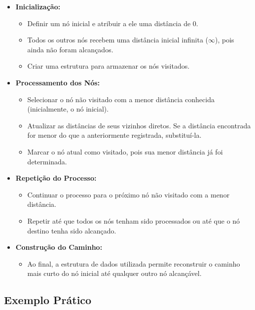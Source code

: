 \documentclass[manuscript,screen,review]{acmart}
\begin{document}
\begin{itemize}
    \item \textbf{Inicialização:}
    \begin{itemize}
        \item Definir um nó inicial e atribuir a ele uma distância de 0.
        \item Todos os outros nós recebem uma distância inicial infinita ($\infty$), pois ainda não foram alcançados.
        \item Criar uma estrutura para armazenar os nós visitados.
    \end{itemize}

    \item \textbf{Processamento dos Nós:}
    \begin{itemize}
        \item Selecionar o nó não visitado com a menor distância conhecida (inicialmente, o nó inicial).
        \item Atualizar as distâncias de seus vizinhos diretos. Se a distância encontrada for menor do que a anteriormente registrada, substituí-la.
        \item Marcar o nó atual como visitado, pois sua menor distância já foi determinada.
    \end{itemize}

    \item \textbf{Repetição do Processo:}
    \begin{itemize}
        \item Continuar o processo para o próximo nó não visitado com a menor distância.
        \item Repetir até que todos os nós tenham sido processados ou até que o nó destino tenha sido alcançado.
    \end{itemize}

    \item \textbf{Construção do Caminho:}
    \begin{itemize}
        \item Ao final, a estrutura de dados utilizada permite reconstruir o caminho mais curto do nó inicial até qualquer outro nó alcançável.
    \end{itemize}
\end{itemize}

\subsection{Exemplo Prático}
\end{document}

